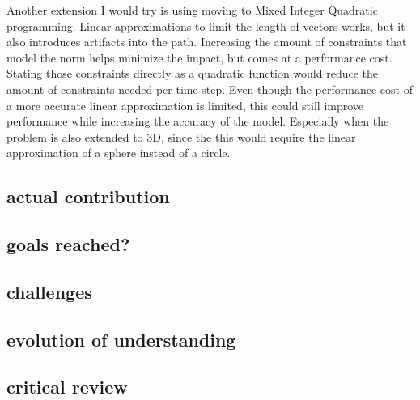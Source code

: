 Another extension I would try is using moving to Mixed Integer Quadratic programming. Linear approximations to limit the length of vectors works, but it also introduces artifacts into the path. Increasing the amount of constraints that model the norm helps minimize the impact, but comes at a performance cost. Stating those constraints directly as a quadratic function would reduce the amount of constraints needed per time step. Even though the performance cost of a more accurate linear approximation is limited, this could still improve performance while increasing the accuracy of the model. Especially when the problem is also extended to 3D, since the this would require the linear approximation of a sphere instead of a circle. \\

\subsection{actual contribution}
\subsection{goals reached?}
\subsection{challenges}
\subsection{evolution of understanding}
\subsection{critical review}